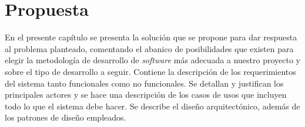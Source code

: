 \chapter{Propuesta}\label{chapter:proposal}

En el presente capítulo se presenta la solución que se propone para dar respuesta al problema planteado, comentando el abanico de posibilidades que existen para elegir la metodología de desarrollo de \textit{software} más adecuada a nuestro proyecto y sobre el tipo de desarrollo a seguir. Contiene la descripción de los requerimientos del sistema tanto funcionales como no funcionales. Se detallan y justifican los principales actores y se hace una descripción de los casos de usos que incluyen todo lo que el sistema debe hacer. Se describe el diseño arquitectónico, además de los patrones de diseño empleados.

